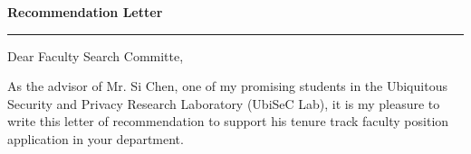 \documentclass[12pt]{letter} %
\begin{document}

\begin{letter}{} 



\begin{center}
\Large\bf Recommendation Letter %
\vspace{20pt} \hrule height 1pt %
\end{center} 

\signature{Kui Ren\\
Associate Professor, IEEE Fellow\\
Department of Computer Science and Engineering\\
University at Buffalo\\
Buffalo, NY\\
Tel: (716) 645-1587\\
Email:kuiren@buffalo.edu} %


\opening{Dear Faculty Search Committe,} 
 
As the advisor of Mr. Si Chen, one of my promising students in the Ubiquitous Security and Privacy Research Laboratory (UbiSeC Lab), it is my pleasure to write this letter of recommendation to support his tenure track faculty position application in your department.


\end{letter}
\end{document}
